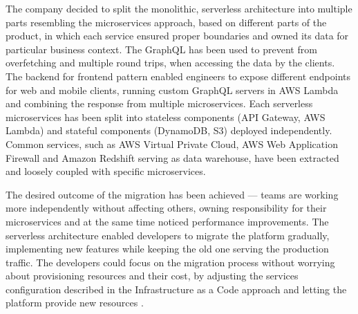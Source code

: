 The company decided to split the monolithic, serverless architecture into multiple parts resembling the microservices approach, based on different parts of the product, in which each service ensured proper boundaries and owned its data for particular business context.
The GraphQL has been used to prevent from overfetching and multiple round trips, when accessing the data by the clients.
The backend for frontend pattern enabled engineers to expose different endpoints for web and mobile clients, running custom GraphQL servers in AWS Lambda and combining the response from multiple microservices.
Each serverless microservices has been split into stateless components (API Gateway, AWS Lambda) and stateful components (DynamoDB, S3) deployed independently.
Common services, such as AWS Virtual Private Cloud, AWS Web Application Firewall and Amazon Redshift serving as data warehouse, have been extracted and loosely coupled with specific microservices.

The desired outcome of the migration has been achieved --- teams are working more independently without affecting others, owning responsibility for their microservices and at the same time noticed performance improvements.
The serverless architecture enabled developers to migrate the platform gradually, implementing new features while keeping the old one serving the production traffic.
The developers could focus on the migration process without worrying about provisioning resources and their cost, by adjusting the services configuration described in the Infrastructure as a Code approach and letting the platform provide new resources \cite{ServerlessArchitectureOnAWS}.






